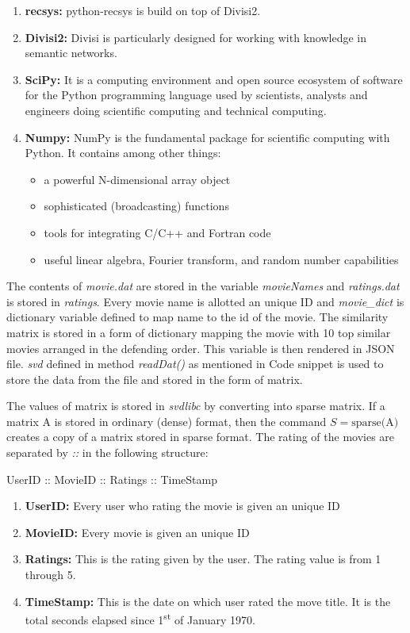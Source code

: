 \documentclass[12pt, titlepage, onecolumn]{article}
\begin{document}
{\begin{enumerate}
	\item{\bf recsys: }python-recsys is build on top of Divisi2.
	\item{\bf Divisi2: }Divisi is particularly designed for working with knowledge in semantic networks.
	\item{\bf SciPy: } It is a computing environment and open source ecosystem of software for the Python programming language used by scientists, analysts and engineers doing scientific computing and technical computing.
	\item{\bf Numpy: }NumPy is the fundamental package for scientific computing with Python. It contains among other things:
		\begin{itemize}
			\item a powerful N-dimensional array object
			\item sophisticated (broadcasting) functions
			\item tools for integrating C/C++ and Fortran code
			\item useful linear algebra, Fourier transform, and random number capabilities
		\end{itemize}
\end{enumerate}

The contents of \emph{movie.dat} are stored in the variable \emph{movieNames} and \emph{ratings.dat} is stored in \emph{ratings}. Every movie name is allotted an unique ID and \emph{movie\_dict} is dictionary variable defined to map name to the id of the movie. The similarity matrix is stored in a form of dictionary mapping the movie with 10 top similar movies arranged in the defending order. This variable is then rendered in JSON file. \emph{svd} defined in method \emph{readDat()} as mentioned in Code snippet is used to store the data from the file and stored in the form of matrix.

The values of matrix is stored in \emph{svdlibc} by converting into sparse matrix. If a matrix A is stored in ordinary (dense) format, then the command $S = \text{sparse(A)}$ creates a copy of a matrix stored in sparse format. The rating of the movies are separated by \emph{::} in the following structure:
\begin{center}
	UserID :: MovieID :: Ratings :: TimeStamp
\end{center}
\begin{enumerate}
	\item {\bf UserID: } Every user who rating the movie is given an unique ID
	\item {\bf MovieID: } Every movie is given an unique ID
	\item {\bf Ratings: } This is the rating given by the user. The rating value is from 1 through 5.
	\item {\bf TimeStamp: }This is the date on which user rated the move title. It is the total seconds elapsed since 1\textsuperscript{st} of  January 1970.
\end{enumerate}


}
\end{document}
